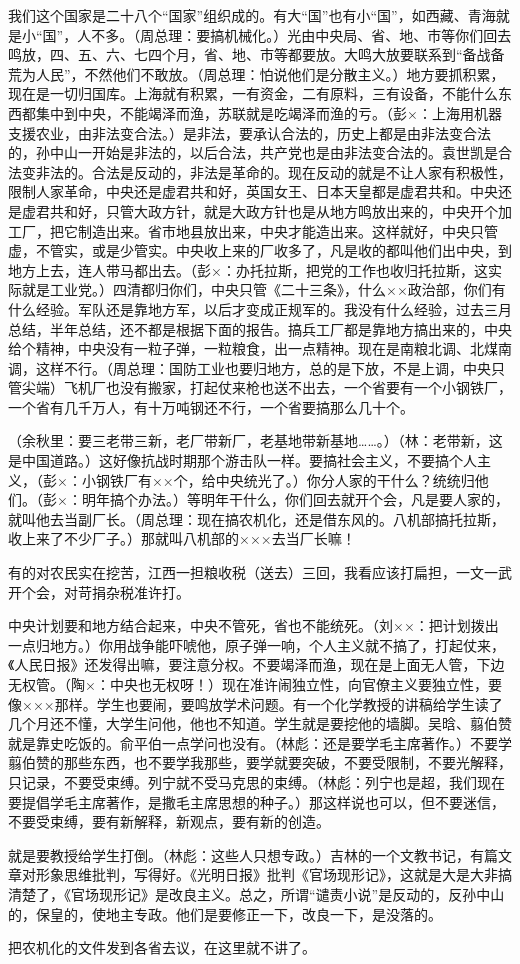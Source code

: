我们这个国家是二十八个“国家”组织成的。有大“国”也有小“国”，如西藏、青海就是小“国”，人不多。（周总理：要搞机械化。）光由中央局、省、地、市等你们回去鸣放，四、五、六、七四个月，省、地、市等都要放。大鸣大放要联系到“备战备荒为人民”，不然他们不敢放。（周总理：怕说他们是分散主义。）地方要抓积累，现在是一切归国库。上海就有积累，一有资金，二有原料，三有设备，不能什么东西都集中到中央，不能竭泽而渔，苏联就是吃竭泽而渔的亏。（彭×：上海用机器支援农业，由非法变合法。）是非法，要承认合法的，历史上都是由非法变合法的，孙中山一开始是非法的，以后合法，共产党也是由非法变合法的。袁世凯是合法变非法的。合法是反动的，非法是革命的。现在反动的就是不让人家有积极性，限制人家革命，中央还是虚君共和好，英国女王、日本天皇都是虚君共和。中央还是虚君共和好，只管大政方针，就是大政方针也是从地方鸣放出来的，中央开个加工厂，把它制造出来。省市地县放出来，中央才能造出来。这样就好，中央只管虚，不管实，或是少管实。中央收上来的厂收多了，凡是收的都叫他们出中央，到地方上去，连人带马都出去。（彭×：办托拉斯，把党的工作也收归托拉斯，这实际就是工业党。）四清都归你们，中央只管《二十三条》，什么××政治部，你们有什么经验。军队还是靠地方军，以后才变成正规军的。我没有什么经验，过去三月总结，半年总结，还不都是根据下面的报告。搞兵工厂都是靠地方搞出来的，中央给个精神，中央没有一粒子弹，一粒粮食，出一点精神。现在是南粮北调、北煤南调，这样不行。（周总理：国防工业也要归地方，总的是下放，不是上调，中央只管尖端）飞机厂也没有搬家，打起仗来枪也送不出去，一个省要有一个小钢铁厂，一个省有几千万人，有十万吨钢还不行，一个省要搞那么几十个。

（余秋里：要三老带三新，老厂带新厂，老基地带新基地……。）（林：老带新，这是中国道路。）这好像抗战时期那个游击队一样。要搞社会主义，不要搞个人主义，（彭×：小钢铁厂有××个，给中央统光了。）你分人家的干什么？统统归他们。（彭×：明年搞个办法。）等明年干什么，你们回去就开个会，凡是要人家的，就叫他去当副厂长。（周总理：现在搞农机化，还是借东风的。八机部搞托拉斯，收上来了不少厂子。）那就叫八机部的×××去当厂长嘛！

有的对农民实在挖苦，江西一担粮收税（送去）三回，我看应该打扁担，一文一武开个会，对苛捐杂税准许打。

中央计划要和地方结合起来，中央不管死，省也不能统死。（刘××：把计划拨出一点归地方。）你用战争能吓唬他，原子弹一响，个人主义就不搞了，打起仗来，《人民日报》还发得出嘛，要注意分权。不要竭泽而渔，现在是上面无人管，下边无权管。（陶×：中央也无权呀！）现在准许闹独立性，向官僚主义要独立性，要像×××那样。学生也要闹，要鸣放学术问题。有一个化学教授的讲稿给学生读了几个月还不懂，大学生问他，他也不知道。学生就是要挖他的墙脚。吴晗、翦伯赞就是靠史吃饭的。俞平伯一点学问也没有。（林彪：还是要学毛主席著作。）不要学翦伯赞的那些东西，也不要学我那些，要学就要突破，不要受限制，不要光解释，只记录，不要受束缚。列宁就不受马克思的束缚。（林彪：列宁也是超，我们现在要提倡学毛主席著作，是撒毛主席思想的种子。）那这样说也可以，但不要迷信，不要受束缚，要有新解释，新观点，要有新的创造。

就是要教授给学生打倒。（林彪：这些人只想专政。）吉林的一个文教书记，有篇文章对形象思维批判，写得好。《光明日报》批判《官场现形记》，这就是大是大非搞清楚了，《官场现形记》是改良主义。总之，所谓“谴责小说”是反动的，反孙中山的，保皇的，使地主专政。他们是要修正一下，改良一下，是没落的。

把农机化的文件发到各省去议，在这里就不讲了。

